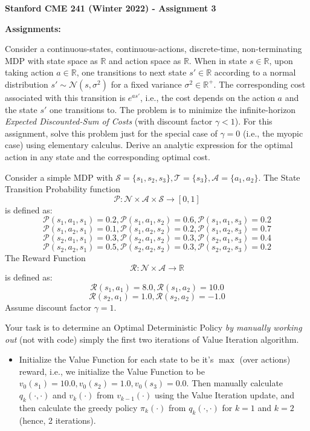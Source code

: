 \documentclass[12pt]{exam}
\begin{document}
\begin{center}
{\large {\bf Stanford CME 241 (Winter 2022) - Assignment 3}}
\end{center}
 
{\large{\bf Assignments:}}
\begin{questions}

\question Consider a continuous-states, continuous-actions, discrete-time, non-terminating MDP with state space as $\mathbb{R}$ and action space as $\mathbb{R}$. When in state $s\in \mathbb{R}$, upon taking action $a\in \mathbb{R}$, one transitions to next state $s' \in \mathbb{R}$ according to a normal distribution $s' \sim \mathcal{N}(s, \sigma^2)$ for a fixed variance $\sigma^2 \in \mathbb{R}^+$. The corresponding cost associated with this transition is $e^{as'}$, i.e., the cost depends on the action $a$ and the state $s'$ one transitions to. The problem is to minimize the infinite-horizon {\em Expected Discounted-Sum of Costs} (with discount factor $\gamma < 1$). For this assignment, solve this problem just for the special case of $\gamma = 0$ (i.e., the myopic case) using elementary calculus. Derive an analytic expression for the optimal action in any state and the corresponding optimal cost.

 Consider a simple MDP with $\mathcal{S} = \{s_1, s_2, s_3\}, \mathcal{T} =\{s_3\}, \mathcal{A} = \{a_1, a_2\}$. The State Transition Probability function
$$\mathcal{P}: \mathcal{N} \times \mathcal{A} \times \mathcal{S} \rightarrow [0, 1]$$
is defined as:
$$\mathcal{P}(s_1, a_1, s_1) = 0.2, \mathcal{P}(s_1, a_1, s_2) = 0.6, \mathcal{P}(s_1, a_1, s_3) = 0.2$$
$$\mathcal{P}(s_1, a_2, s_1) = 0.1, \mathcal{P}(s_1, a_2, s_2) = 0.2, \mathcal{P}(s_1, a_2, s_3) = 0.7$$
$$\mathcal{P}(s_2, a_1, s_1) = 0.3, \mathcal{P}(s_2, a_1, s_2) = 0.3, \mathcal{P}(s_2, a_1, s_3) = 0.4$$
$$\mathcal{P}(s_2, a_2, s_1) = 0.5, \mathcal{P}(s_2, a_2, s_2) = 0.3, \mathcal{P}(s_2, a_2, s_3) = 0.2$$
The Reward Function 
$$\mathcal{R}: \mathcal{N} \times \mathcal{A} \rightarrow \mathbb{R}$$
is defined as:
$$\mathcal{R}(s_1, a_1) = 8.0, \mathcal{R}(s_1, a_2) = 10.0$$
$$\mathcal{R}(s_2, a_1) = 1.0, \mathcal{R}(s_2, a_2) = -1.0$$
Assume discount factor $\gamma = 1$.

Your task is to determine an Optimal Deterministic Policy {\em by manually working out} (not with code) simply the first two iterations of Value Iteration algorithm. 

\begin{itemize}
	\item Initialize the Value Function for each state to be it's $\max$ (over actions) reward, i.e., we initialize the Value Function to be $v_0(s_1) = 10.0, v_0(s_2) = 1.0, v_0(s_3) = 0.0$. Then manually calculate $q_k(\cdot, \cdot)$ and $v_k(\cdot)$ from $v_{k - 1}( \cdot)$ using the Value Iteration update, and then calculate the greedy policy $\pi_k(\cdot)$ from $q_k(\cdot, \cdot)$ for $k = 1$ and $k = 2$ (hence, 2 iterations).
	

\end{itemize}
\end{questions}
\end{document}

